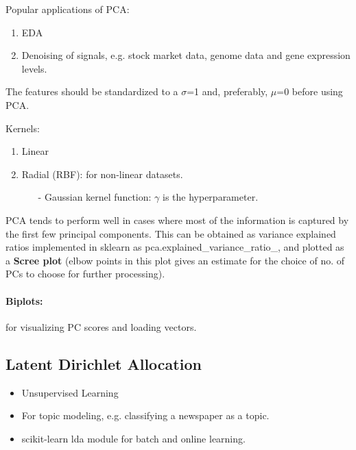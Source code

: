 \documentclass[a4paper, 12pt]{report}
\begin{document}
Popular applications of PCA:
\begin{enumerate}
\item EDA
\item Denoising of signals, e.g. stock market data, genome data and gene expression levels.
\end{enumerate}

The features should be standardized to a $\sigma$=1 and, preferably, $\mu$=0 before using PCA. 

\vspace{12pt}
Kernels:
\begin{enumerate} %

\item Linear
\item Radial (RBF): for non-linear datasets.
\begin{itemize}
\item[-] Gaussian kernel function: $\gamma$ is the hyperparameter.
\end{itemize}

\end{enumerate}

PCA tends to perform well in cases where most of the information is captured by the first few principal components. This can be obtained as variance explained ratios implemented in sklearn as pca.explained\_variance\_ratio\_, and plotted as a \textbf{Scree plot} (elbow points in this plot gives an estimate for the choice of no. of PCs to choose for further processing).

\paragraph{Biplots:}for visualizing PC scores and loading vectors.


\subsection{Latent Dirichlet Allocation}
\begin{itemize}
\item Unsupervised Learning
\item For topic modeling, e.g. classifying a newspaper as a topic.
\item {\color{cyan}scikit-learn lda module} for batch and online learning.
\end{itemize}
\end{document}
